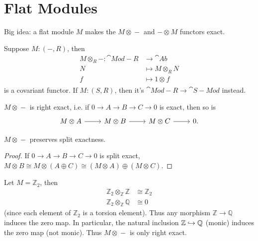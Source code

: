 \documentclass[twoside,10pt]{report}
\begin{document}
\section{Flat Modules}

\begin{note}[]
Big idea: a flat module $M$ makes the $M \otimes_{}-$ and $-\otimes_{}M$ functors exact.
\end{note}

Suppose $M:(-,R)$, then
\begin{align*}
	M \otimes_{R} - : \cat{Mod-R} &\to \cat{Ab} \\
			N &\mapsto M \otimes_{R} N \\
			f &\mapsto 1 \otimes_{}f
		\end{align*} is a covariant functor. If $M:(S,R)$, then it's $\cat{Mod-R}\to \cat{S-Mod}$ instead.

\begin{thrm}
$M \otimes_{}-$ is right exact, i.e. if $0\to A\to B\to C\to 0$ is exact, then so is
\[
\begin{tikzcd}
	M\otimes_{}A \rar & M\otimes_{}B \rar & M\otimes_{}C \rar & 0.
\end{tikzcd}
\] 
\end{thrm}

\begin{prop}
	$M \otimes_{}-$ preserves split exactness.
\end{prop}
\begin{proof}
	If $0\to A\to B\to C\to 0$ is split exact, $M\otimes_{}B \cong M\otimes_{}(A \oplus C) \cong (M\otimes_{}A) \oplus (M\otimes_{}C)$.
\end{proof}

\begin{ex}[]
Let $M=\mathbb{Z}_2$, then
\begin{align*}
	\mathbb{Z}_2 \otimes_{\mathbb{Z}} \mathbb{Z} &\cong \mathbb{Z}_2 \\
	\mathbb{Z}_2 \otimes_{\mathbb{Z}} \mathbb{Q} &\cong 0
\end{align*}
(since each element of $\mathbb{Z}_2$ is a torsion element). Thus any morphism $\mathbb{Z}\to \mathbb{Q}$ induces the zero map. In particular, the natural inclusion $\mathbb{Z}\hookrightarrow \mathbb{Q}$ (monic) induces the zero map (not monic). Thus $M \otimes_{}-$ is only right exact.
\end{ex}
\end{document}
